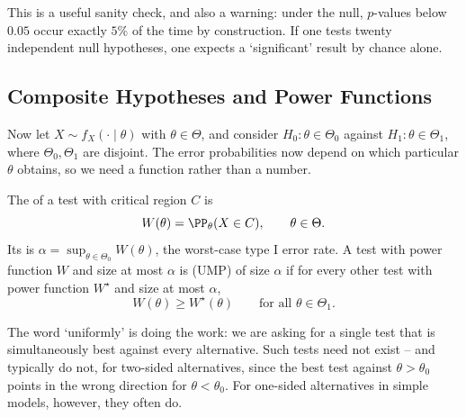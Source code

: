 This is a useful sanity check, and also a warning: under the null, $p$-values below $0.05$ occur exactly $5\%$ of the time by construction. If one tests twenty independent null hypotheses, one expects a `significant' result by chance alone.

\subsection{Composite Hypotheses and Power Functions}

Now let $X \sim f_X(\cdot\mid\theta)$ with $\theta \in \Theta$, and consider $H_0 : \theta \in \Theta_0$ against $H_1 : \theta \in \Theta_1$, where $\Theta_0, \Theta_1$ are disjoint. The error probabilities now depend on which particular $\theta$ obtains, so we need a function rather than a number.

\begin{definition}
  The  of a test with critical region $C$ is
  $$
  W(\theta) = \PP_\theta(X \in C), \qquad \theta \in \Theta.
  $$
  Its  is $\alpha = \sup_{\theta\in\Theta_0}W(\theta)$, the worst-case type I error rate. A test with power function $W$ and size at most $\alpha$ is  (UMP) of size $\alpha$ if for every other test with power function $W^\star$ and size at most $\alpha$,
  $$
  W(\theta) \geq W^\star(\theta) \qquad \text{for all } \theta \in \Theta_1.
  $$
\end{definition}

The word `uniformly' is doing the work: we are asking for a single test that is simultaneously best against every alternative. Such tests need not exist -- and typically do not, for two-sided alternatives, since the best test against $\theta > \theta_0$ points in the wrong direction for $\theta < \theta_0$. For one-sided alternatives in simple models, however, they often do.

